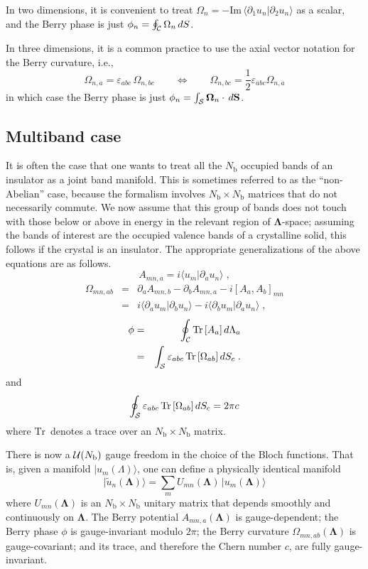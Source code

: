 \documentclass[11pt]{article}
\numberwithin{equation}{section} %
\def\nn{\nonumber\\}
\def\bea{\begin{eqnarray}}
\def\eea{\end{eqnarray}}
\def\beq{\begin{equation}}
\def\eeq{\end{equation}}
\renewcommand{\Im}{\textrm{Im}}
\def\ket#1{\vert #1 \rangle}
\def\ip#1#2{\langle #1 \vert #2 \rangle}
\def\O{{\Omega}}
\def\bO{\mathbf{\Omega}}
\def\pa{\partial_a}
\def\pb{\partial_b}
\def\L{\Lambda}
\def\bL{\mathbf{\Lambda}}
\def\Im{\textrm{Im}\,}
\def\Tr{\textrm{Tr}\,}
\def\cC{{\cal C}}
\def\cS{{\cal S}}
\def\ve{\varepsilon}
\def\Nb{N_\textrm{b}}
\def\half{\frac{\textstyle{1}}{\textstyle{2}}}
\begin{document}
In two dimensions, it is convenient to treat $\O_n=-\Im
\ip{\partial_1 u_n}{\partial_2 u_n}$ as a scalar, and the Berry
phase is just $\phi_n=\oint_\cC \O_n\,dS$.

In three dimensions, it is a common practice to use the axial vector
notation for the Berry curvature, i.e.,
%
\beq
\O_{n,a}= \ve_{abc}\,\O_{n,bc} \qquad\Leftrightarrow\qquad
\O_{n,bc} = \half  \ve_{abc} \O_{n,a}
\eeq
%
in which case the Berry phase is just
$\phi_n=\int_\cS \bO_n\cdot\,d\mathbf{S}$.

\subsection{Multiband case}

It is often the case that one wants to treat all the $\Nb$ occupied
bands of an insulator as a joint band manifold.  This is sometimes
referred to as the ``non-Abelian'' case, because the formalism
involves $\Nb\times\Nb$ matrices that do not necessarily commute.
We now assume that this group of bands does not touch with those
below or above in energy in the relevant region of $\bL$-space;
assuming the bands of interest are the occupied valence bands of
a crystalline solid, this follows if the crystal is an insulator.
The appropriate generalizations of the above equations are
as follows.
%
\beq
A_{mn,a}=i\ip{u_m}{\pa u_n} \;,
\eeq
%
\bea
\O_{mn,ab} &=& \pa A_{mn,b} - \pb A_{mn,a} -i[A_a,A_b]_{mn} \nn
   &=&  i\ip{\pa u_m}{\pb u_n}-i\ip{\pb u_m}{\pa u_n} \;,
\eea
%
\bea
\phi
&=&\oint_\cC \Tr[A_a]\,d\L_a \label{eq:bp}\\
&=& \int_\cS \ve_{abc}\,\Tr[\O_{ab}]\,dS_c \;.
\eea
%
and
%
\beq
\oint_\cS \ve_{abc}\,\Tr[\O_{ab}]\,dS_c=2\pi c
\eeq
%
where $\Tr$ denotes a trace over an $\Nb\times\Nb$ matrix.

There is now a ${\cal U}(\Nb)$ gauge freedom in the choice of the
Bloch functions.  That is, given a manifold
$\ket{u_m(\L)}$, one can define a physically identical manifold
%
\beq
\ket{\tilde{u}_n(\bL)}=\sum_m U_{mn}(\bL)\,\ket{u_m(\bL)}
\eeq
%
where $U_{mn}(\bL)$ is an $\Nb\times\Nb$ unitary matrix that
depends smoothly and continuously on $\bL$.
The Berry potential $A_{mn,a}(\bL)$ is gauge-dependent;
the Berry phase $\phi$ is gauge-invariant modulo $2\pi$;
the Berry curvature $\O_{mn,ab}(\bL)$ is gauge-covariant;
and its trace, and therefore the Chern number $c$, are fully
gauge-invariant.
\end{document}
